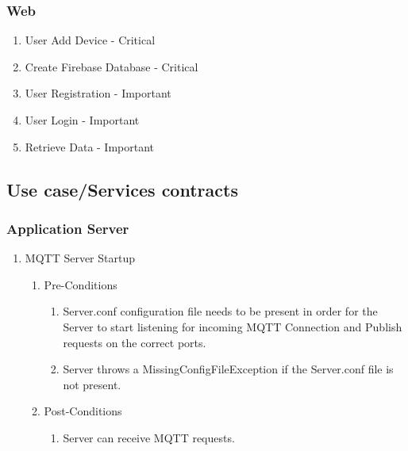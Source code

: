 \documentclass{article}
\begin{document}
	\subsubsection{Web}
	\begin{enumerate}
		\item	User Add Device - Critical
		\item	Create Firebase Database - Critical
		\item	User Registration - Important
		\item	User Login - Important
		\item	Retrieve Data  - Important
	\end{enumerate}
	\subsection{Use case/Services contracts}
	\subsubsection{Application Server}
	\begin{enumerate}
		\item	MQTT Server Startup
		\begin{enumerate}
			\item  Pre-Conditions
			\begin{enumerate}
				\item  	Server.conf configuration file needs to be present in order for the Server to start listening for incoming MQTT Connection and 
				Publish requests on the correct ports.
				\item	Server throws a MissingConfigFileException if the Server.conf file is not present.
			\end{enumerate}
			\item  Post-Conditions		
			\begin{enumerate}
				\item	Server can receive MQTT requests.
			\end{enumerate}
		\end{enumerate}
	\end{enumerate}
\end{document}
